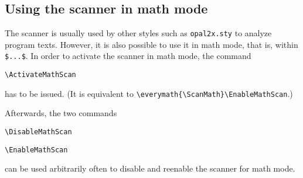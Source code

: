 \subsection{Using the scanner in math mode}

The scanner is usually used by other styles such as \verb=opal2x.sty= to
analyze program texts. However, it is also possible to use it in math
mode, that is, within \verb=$...$=. In order to activate the scanner in
math mode, the command

\quad\verb=\ActivateMathScan=

has to be issued. (It is equivalent to
\verb=\everymath{\ScanMath}\EnableMathScan=.)

Afterwards, the two commands

\quad\verb=\DisableMathScan=

\quad\verb=\EnableMathScan=

can be used arbitrarily often to disable and reenable the scanner for math
mode. 




